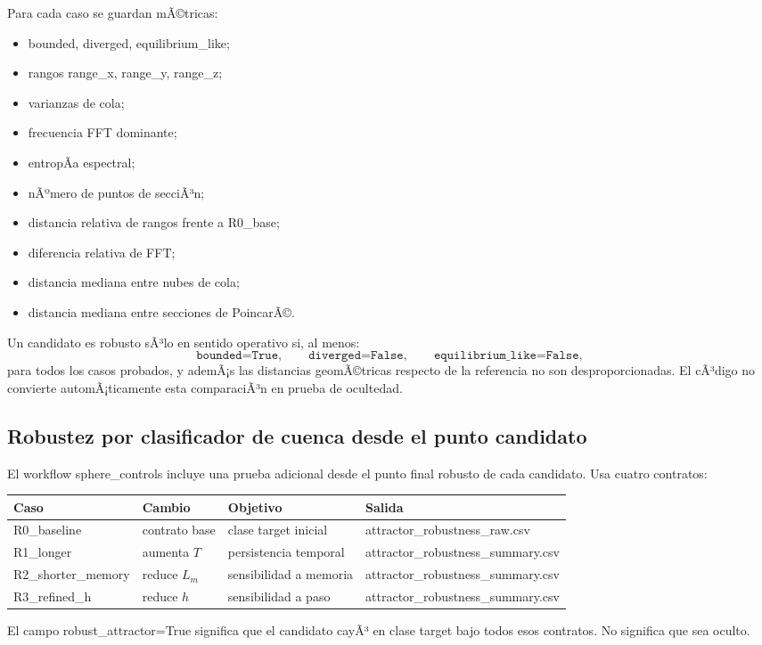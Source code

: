 \documentclass[11pt]{article}
\DeclareRobustCommand{\codepath}[1]{\begingroup\Urlmuskip=0mu plus 2mu\path{#1}\endgroup}
\def\codepath#1{#1}%
\begin{document}
Para cada caso se guardan mÃ©tricas:
\begin{itemize}
\item \codepath{bounded}, \codepath{diverged}, \codepath{equilibrium_like};
\item rangos \codepath{range_x}, \codepath{range_y}, \codepath{range_z};
\item varianzas de cola;
\item frecuencia FFT dominante;
\item entropÃ­a espectral;
\item nÃºmero de puntos de secciÃ³n;
\item distancia relativa de rangos frente a \codepath{R0_base};
\item diferencia relativa de FFT;
\item distancia mediana entre nubes de cola;
\item distancia mediana entre secciones de PoincarÃ©.
\end{itemize}

Un candidato es robusto sÃ³lo en sentido operativo si, al menos:
\begin{equation}
\texttt{bounded=True},\qquad
\texttt{diverged=False},\qquad
\texttt{equilibrium\_like=False},
\end{equation}
para todos los casos probados, y ademÃ¡s las distancias geomÃ©tricas respecto de la referencia no son desproporcionadas. El cÃ³digo no convierte automÃ¡ticamente esta comparaciÃ³n en prueba de ocultedad.

\subsection{Robustez por clasificador de cuenca desde el punto candidato}

El workflow \codepath{sphere_controls} incluye una prueba adicional desde el punto final robusto de cada candidato. Usa cuatro contratos:
\begin{center}
\begin{tabular}{@{}llll@{}}
\toprule
Caso & Cambio & Objetivo & Salida\\
\midrule
\codepath{R0_baseline} & contrato base & clase target inicial & \codepath{attractor_robustness_raw.csv}\\
\codepath{R1_longer} & aumenta \(T\) & persistencia temporal & \codepath{attractor_robustness_summary.csv}\\
\codepath{R2_shorter_memory} & reduce \(L_m\) & sensibilidad a memoria & \codepath{attractor_robustness_summary.csv}\\
\codepath{R3_refined_h} & reduce \(h\) & sensibilidad a paso & \codepath{attractor_robustness_summary.csv}\\
\bottomrule
\end{tabular}
\end{center}
El campo \codepath{robust_attractor=True} significa que el candidato cayÃ³ en clase target bajo todos esos contratos. No significa que sea oculto.
\end{document}
